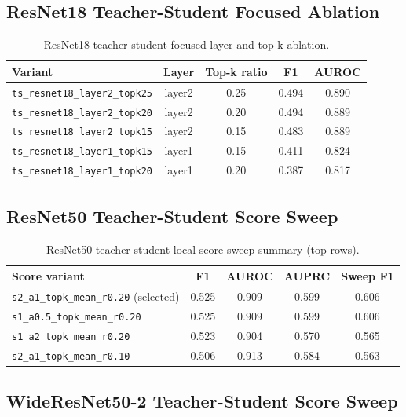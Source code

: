 \documentclass[11pt]{article}
\begin{document}
\subsection{ResNet18 Teacher-Student Focused Ablation}

\begin{table}[H]
\centering
\caption{ResNet18 teacher-student focused layer and top-k ablation.}
\label{tab:appendix_ts_resnet18}
\begin{tabular}{lcccc}
\toprule
Variant & Layer & Top-k ratio & F1 & AUROC \\
\midrule
\texttt{ts\_resnet18\_layer2\_topk25} & layer2 & 0.25 & 0.494 & 0.890 \\
\texttt{ts\_resnet18\_layer2\_topk20} & layer2 & 0.20 & 0.494 & 0.889 \\
\texttt{ts\_resnet18\_layer2\_topk15} & layer2 & 0.15 & 0.483 & 0.889 \\
\texttt{ts\_resnet18\_layer1\_topk15} & layer1 & 0.15 & 0.411 & 0.824 \\
\texttt{ts\_resnet18\_layer1\_topk20} & layer1 & 0.20 & 0.387 & 0.817 \\
\bottomrule
\end{tabular}
\end{table}

\subsection{ResNet50 Teacher-Student Score Sweep}

\begin{table}[H]
\centering
\caption{ResNet50 teacher-student local score-sweep summary (top rows).}
\label{tab:appendix_ts_resnet50}
\begin{tabular}{lcccc}
\toprule
Score variant & F1 & AUROC & AUPRC & Sweep F1 \\
\midrule
\texttt{s2\_a1\_topk\_mean\_r0.20} (selected) & 0.525 & 0.909 & 0.599 & 0.606 \\
\texttt{s1\_a0.5\_topk\_mean\_r0.20}           & 0.525 & 0.909 & 0.599 & 0.606 \\
\texttt{s1\_a2\_topk\_mean\_r0.20}             & 0.523 & 0.904 & 0.570 & 0.565 \\
\texttt{s2\_a1\_topk\_mean\_r0.10}             & 0.506 & 0.913 & 0.584 & 0.563 \\
\bottomrule
\end{tabular}
\end{table}

\subsection{WideResNet50-2 Teacher-Student Score Sweep}
\end{document}
